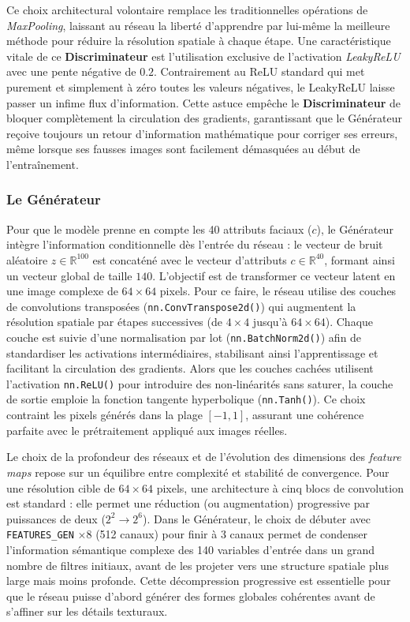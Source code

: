 \documentclass{article}
\newcommand{\code}[1]{\colorbox{light-gray}{\texttt{#1}}}
\begin{document}
Ce choix architectural volontaire remplace les traditionnelles opérations de \textit{MaxPooling}, laissant au réseau la liberté d'apprendre par lui-même la meilleure méthode pour réduire la résolution spatiale à chaque étape. Une caractéristique vitale de ce \textbf{Discriminateur} est l'utilisation exclusive de l'activation \textit{LeakyReLU} avec une pente négative de $0.2$. Contrairement au ReLU standard qui met purement et simplement à zéro toutes les valeurs négatives, le LeakyReLU laisse passer un infime flux d'information. Cette astuce empêche le \textbf{Discriminateur} de bloquer complètement la circulation des gradients, garantissant que le Générateur reçoive toujours un retour d'information mathématique pour corriger ses erreurs, même lorsque ses fausses images sont facilement démasquées au début de l'entraînement.

\subsubsection*{Le Générateur}

Pour que le modèle prenne en compte les 40 attributs faciaux ($c$), le Générateur intègre l'information conditionnelle dès l'entrée du réseau : le vecteur de bruit aléatoire $z \in \mathbb{R}^{100}$ est concaténé avec le vecteur d'attributs $c \in \mathbb{R}^{40}$, formant ainsi un vecteur global de taille $140$. L'objectif est de transformer ce vecteur latent en une image complexe de $64 \times 64$ pixels. Pour ce faire, le réseau utilise des couches de convolutions transposées (\code{nn.ConvTranspose2d()}) qui augmentent la résolution spatiale par étapes successives (de $4 \times 4$ jusqu'à $64 \times 64$). Chaque couche est suivie d'une normalisation par lot (\code{nn.BatchNorm2d()}) afin de standardiser les activations intermédiaires, stabilisant ainsi l'apprentissage et facilitant la circulation des gradients. Alors que les couches cachées utilisent l'activation \code{nn.ReLU()} pour introduire des non-linéarités sans saturer, la couche de sortie emploie la fonction tangente hyperbolique (\code{nn.Tanh()}). Ce choix contraint les pixels générés dans la plage $[-1, 1]$, assurant une cohérence parfaite avec le prétraitement appliqué aux images réelles.

\medskip

Le choix de la profondeur des réseaux et de l'évolution des dimensions des \textit{feature maps} repose sur un équilibre entre complexité et stabilité de convergence. Pour une résolution cible de $64 \times 64$ pixels, une architecture à cinq blocs de convolution est standard : elle permet une réduction (ou augmentation) progressive par puissances de deux ($2^2 \to 2^6$). Dans le Générateur, le choix de débuter avec \code{FEATURES\_GEN} $\times 8$ (512 canaux) pour finir à 3 canaux permet de condenser l'information sémantique complexe des 140 variables d'entrée dans un grand nombre de filtres initiaux, avant de les projeter vers une structure spatiale plus large mais moins profonde. Cette décompression progressive est essentielle pour que le réseau puisse d'abord générer des formes globales cohérentes avant de s'affiner sur les détails texturaux.
\end{document}
